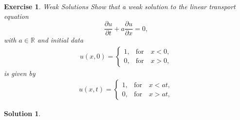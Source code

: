 \documentclass[10pt,letterpaper]{article}
\theoremstyle{break}
\newtheorem{exercise}{Exercise}
\newtheorem{mysolution}{Solution}
\newenvironment{solution}{\begin{mysolution}}{\end{mysolution}}
\begin{document}
\begin{exercise}{Weak Solutions}
	Show that a weak solution to the linear transport equation 
	$$
		\frac{\partial u}{\partial t} 
		+ 
		a 
		\frac{\partial u}{\partial x}  = 0, 
	$$
	with $a\in \mathbb{R}$ and initial data 
	\begin{align}
		u(x,0) = 
		\left\{
		\begin{array}{ll}
		1, & \text{for} \quad x<0,\\
		0, &\text{for} \quad x > 0,
		\end{array}
		\right.
	\end{align}
	is given by
	\begin{align} 
		u(x,t) = 
		\left\{
		\begin{array}{ll}
		1, & \text{for} \quad x<at,\\
		0, & \text{for} \quad x > at,
		\end{array}
		\right.
	\end{align}
\end{exercise}

\begin{solution}
    
\end{solution}
\end{document}
